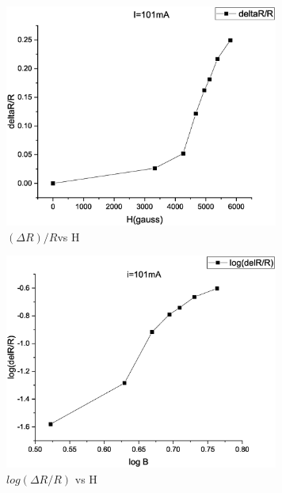 \begin{figure}[h!]
\centering
\includegraphics[width=90mm]{images/Graph3.eps}%
\caption{\label{fig:epsart} \((\Delta R)/R \)vs H}
\end{figure}
\begin{figure}[h!]
\centering
\includegraphics[width=90mm]{images/Graph4.eps}%
\caption{\label{fig:epsart} \(log(\Delta R/R)\) vs H}
\end{figure}

